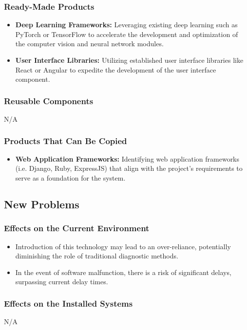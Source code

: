 \documentclass[12pt]{article}
\begin{document}
\subsubsection{Ready-Made Products}
\begin{itemize}
    \item \textbf{Deep Learning Frameworks:} Leveraging existing deep learning such as PyTorch or TensorFlow to accelerate the development and optimization of the computer vision and neural network modules.
    \item \textbf{User Interface Libraries:} Utilizing established user interface libraries like React or Angular to expedite the development of the user interface component.
\end{itemize}
\subsubsection{Reusable Components}
N/A
\subsubsection{Products That Can Be Copied}
\begin{itemize}
    \item \textbf{Web Application Frameworks:} Identifying web application frameworks (i.e. Django, Ruby, ExpressJS) that align with the project's requirements to serve as a foundation for the system.
\end{itemize}

\subsection{New Problems}

\subsubsection{Effects on the Current Environment}
\begin{itemize}
    \item Introduction of this technology may lead to an over-reliance, potentially diminishing the role of traditional diagnostic methods. 
    \item In the event of software malfunction, there is a risk of significant delays, surpassing current delay times. 
\end{itemize}
\subsubsection{Effects on the Installed Systems}
    N/A
\end{document}
